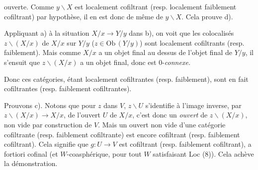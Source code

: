 \documentclass[11pt]{article}
\newcommand{\printedpage}[1]{\marginpar{\footnotesize p.~#1}}
\newcommand{\msp}[1]{\marginpar{\footnotesize [#1]}}
\newcommand{\margmark}[1]{\marginpar{\footnotesize #1}}
\newcommand{\Ob}{\mathrm{Ob}}
\begin{document}
\printedpage{59}

ouverte. Comme $y\backslash X$ est localement cofiltrant (resp. localement faiblement cofiltrant) par hypothèse, il en est donc de même de $y\backslash X$. Cela prouve d).

Appliquant a) à la situation $X/x \longrightarrow Y/y$ dans b), on voit que les colocalisés $z\backslash(X/x)$ de
\margmark{!} %
$X/x$ sur $Y/y$ ($z \in \Ob\,(Y/y)$) sont localement cofiltrants (resp. faiblement). Mais comme $X/x$ a un objet final au dessus de l'objet final de $Y/y$, il s'ensuit que $z\backslash(X/x)$ a un objet final, donc est $0$-\textit{connexe.}

\msp{page 95}
Donc ces catégories, étant localement cofiltrantes (resp. faiblement), sont en fait cofiltrantes (resp. faiblement cofiltrantes).

Prouvons c). Notons que pour $z$ dans $V$, $z\backslash U$ s'identifie à l'image inverse, par $z\backslash(X/x) \longrightarrow X/x$, de l'ouvert $U$ de $X/x$, c'est donc un \textit{ouvert} de $z\backslash(X/x)$, non vide par construction de $V$. Mais un ouvert non vide d'une catégorie cofiltrante (resp. faiblement cofiltrante) est encore cofiltrant (resp. faiblement cofiltrant). Cela signifie que $g : U \longrightarrow V$ est cofiltrant (resp. faiblement cofiltrant), a fortiori cofinal (et $W$-coasphérique, pour tout $W$ satisfaisant Loc (8)). Cela achève la démonstration.
\end{document}
